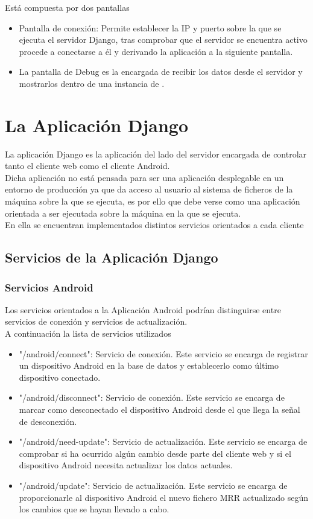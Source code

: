 Está compuesta por dos pantallas
\begin{itemize}
\item Pantalla de conexión: Permite establecer la IP y puerto sobre la que se ejecuta el servidor Django, tras comprobar que el servidor se encuentra activo procede a conectarse a él y derivando la aplicación a la siguiente pantalla.
\item La pantalla de Debug es la encargada de recibir los datos desde el servidor y mostrarlos dentro de una instancia de \robotto.
\end{itemize}


\section{La Aplicación Django}
La aplicación Django es la aplicación del lado del servidor encargada de controlar tanto el cliente web como el cliente Android.\\
Dicha aplicación no está pensada para ser una aplicación desplegable en un entorno de producción ya que da acceso al usuario al sistema de ficheros de la máquina sobre la que se ejecuta, es por ello que debe verse como una aplicación orientada a ser ejecutada sobre la máquina en la que se ejecuta.\\

En ella se encuentran implementados distintos servicios orientados a cada cliente
\subsection{Servicios de la Aplicación Django}

\subsubsection{Servicios Android}
Los servicios orientados a la Aplicación Android podrían distinguirse entre servicios de conexión y servicios de actualización.\\
A continuación la lista de servicios utilizados
\begin{itemize}
\item "\slash android/connect": Servicio de conexión. Este servicio se encarga de registrar un dispositivo Android en la base de datos y establecerlo como último dispositivo conectado.
\item "\slash android/disconnect": Servicio de conexión. Este servicio se encarga de marcar como desconectado el dispositivo Android desde el que llega la señal de desconexión.
\item "\slash android/need-update": Servicio de actualización. Este servicio se encarga de comprobar si ha ocurrido algún cambio desde parte del cliente web y si el dispositivo Android necesita actualizar los datos actuales.
\item "\slash android/update": Servicio de actualización. Este servicio se encarga de proporcionarle al dispositivo Android el nuevo fichero MRR actualizado según los cambios que se hayan llevado a cabo.
\end{itemize}

